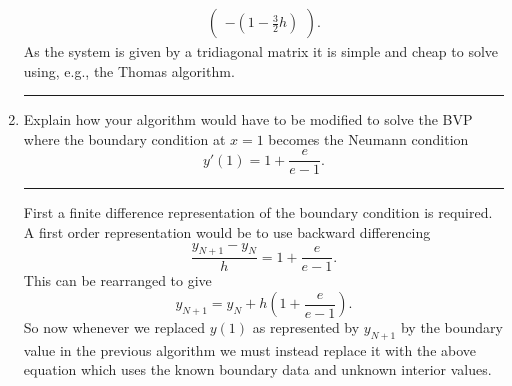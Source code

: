 \documentclass[10pt]{article}
\begin{document}
\begin{enumerate}
\begin{align*}
\begin{pmatrix}
      - \left( 1 - \tfrac{3}{2} h \right)
    \end{pmatrix}.
  \end{align*}
  As the system is given by a tridiagonal matrix it is simple and
  cheap to solve using, e.g., the Thomas algorithm.
  \begin{center}
    \rule{0.9\textwidth}{.1pt}
  \end{center}
\item Explain how your algorithm would have to be modified to solve
  the BVP where the boundary condition at $x=1$ becomes the Neumann
  condition 
  \begin{equation*}
    y'(1) = 1 + \frac{e}{e-1}.
  \end{equation*}
  \begin{center}
    \rule{0.9\textwidth}{.1pt}
  \end{center}
  First a finite difference representation of the boundary condition
  is required. A first order representation would be to use backward
  differencing
  \begin{equation*}
    \frac{y_{N+1} - y_N}{h} = 1 + \frac{e}{e-1}.
  \end{equation*}
  This can be rearranged to give
  \begin{equation*}
    y_{N+1} = y_N + h \left( 1 + \frac{e}{e-1} \right).
  \end{equation*}
  So now whenever we replaced $y(1)$ as represented by $y_{N+1}$ by
  the boundary value in the previous algorithm we must instead replace
  it with the above equation which uses the known boundary data and
  unknown interior values. 


\end{enumerate}
\end{document}
